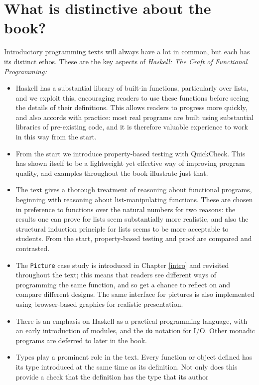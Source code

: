 \section*{What is distinctive about the book?}

Introductory programming texts will always have a lot in common, but each has its distinct ethos. These are the key aspects of \emph{Haskell: The Craft of Functional Programming:}
\begin{itemize}
\item
Haskell has a
substantial library of built-in functions, particularly over lists, and
we exploit this, encouraging readers to use these functions
before seeing the details of their definitions. This allows readers
to progress more quickly, and also accords with practice: most real
programs are built using substantial libraries of pre-existing code, and it is 
therefore valuable
experience to work in this way
from the start. 
\item
From the start we introduce property-based testing with QuickCheck. This has shown itself to be a lightweight yet effective way of improving program quality, and examples throughout the book illustrate just that. 
\item
The text gives a thorough treatment of reasoning about functional
programs, beginning with reasoning about list-manipulating functions.
These are chosen in preference to functions over the natural numbers for
two reasons: the results one can prove for lists seem substantially more
realistic, and also the structural induction principle for lists seems
to be more acceptable to students. From the start, property-based testing and proof are compared and contrasted.
\item
The \texttt{Picture} case study is introduced in Chapter \ref{intro} and
revisited throughout the text; this means that readers see different
ways of programming the same function, and so get a chance to reflect on
and compare different designs. The same interface for pictures is also implemented using browser-based graphics for realistic presentation.
\item
There is an emphasis on Haskell as a practical programming language, with an
early introduction of modules, and the 
\texttt{do} notation for I/O. Other monadic programs are deferred to later in the book. 
\item
Types play a prominent role in the text. Every function or object
defined has its type
introduced at the same time as its definition. Not only does this
provide a check that the definition has the type that its author

\end{itemize}
